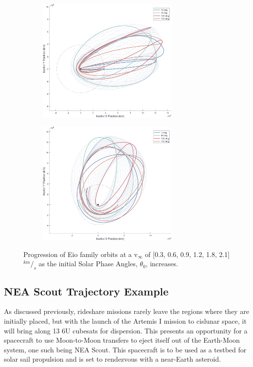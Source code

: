 \documentclass[letterpaper, paper,11pt]{AAS}	%
\begin{document}
\begin{figure}[h!]
    \begin{subfigure}{}
        \includegraphics[trim=75 50 0 0, clip, width=2.75in]{./figs/mooni_ThetaPlot_io_famE_vInf1.8.png}
    \end{subfigure}
    \begin{subfigure}{}
        \includegraphics[trim=75 50 0 0, clip, width=2.75in]{./figs/mooni_ThetaPlot_io_famE_vInf2.1.png}
    \end{subfigure}
    \caption{Progression of Eio family orbits at a v\(_\infty\) of [0.3, 0.6, 0.9, 1.2, 1.8, 2.1] \(^{km}/_s\) as the initial Solar Phase Angles, \(\theta_0\), increases.}
    \label{fig:mooni_thetaPlot_io_E_2.1}
\end{figure}

\clearpage

\subsection*{NEA Scout Trajectory Example}

As discussed previously, rideshare missions rarely leave the regions where they are initially placed, but with the launch of the Artemis I mission to cislunar space, it will bring along 13 6U cubesats for dispersion. This presents an opportunity for a spacecraft to use Moon-to-Moon transfers to eject itself out of the Earth-Moon system, one such being NEA Scout. This spacecraft is to be used as a testbed for solar sail propulsion and is set to rendezvous with a near-Earth asteroid. 
\end{document}
